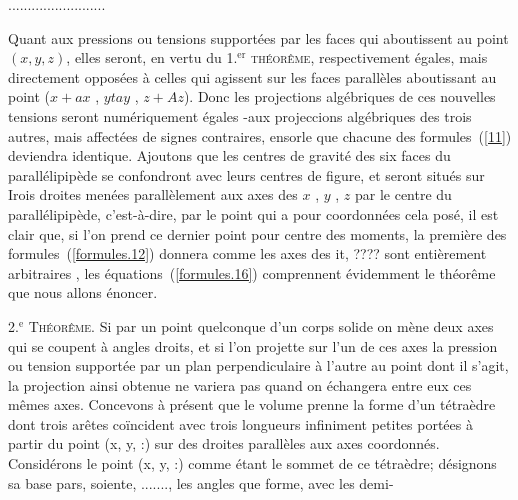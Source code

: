 \documentclass[11pt, twoside, leqno]{article}
\renewcommand{\eqref}[1]{(\ref{#1})}
\begin{document}
.........................

Quant aux pressions ou tensions supportées par les faces qui aboutissent au point $(x,y,z)$, elles seront, en vertu du 1.${^{\text{er}}}$ \textsc{théorême}, respectivement égales, mais directement opposées à celles qui agissent sur les faces parallèles aboutissant au point ($x + ax$ , $y tay$ , $z + Az$). Donc les projections algébriques de ces nouvelles tensions seront numériquement égales -aux projeccions algébriques des trois autres, mais affectées de signes contraires, ensorle que chacune des formules~\eqref{11} deviendra identique. Ajoutons que les centres de gravité des six faces du parallélipipède se confondront avec leurs centres de figure, et seront situés sur Irois droites menées parallèlement aux axes des $x$ , $y$ , $z$ par le centre du parallélipipède, c'est\hbox{-}à\hbox{-}dire, par le point qui a pour coordonnées cela posé, il est clair que, si l'on prend ce dernier point pour centre des moments, la première des formules~\eqref{formules.12} donnera comme les axes des it, ???? sont entièrement arbitraires , les équations~\eqref{formules.16} comprennent évidemment le théorême que nous allons énoncer.

2.${^{\text{e}}}$ \textsc{Théorême}.
Si par un point quelconque d'un corps solide on mène deux axes qui se coupent à angles droits, et si l'on projette sur l'un de ces axes la pression ou tension supportée par un plan perpendiculaire à l'autre au point dont il s'agit, la projection ainsi obtenue ne variera pas quand on échangera entre eux ces mêmes axes. Concevons à présent que le volume prenne la forme d'un tétraèdre dont trois arêtes coïncident avec trois longueurs infiniment petites portées à partir du point (x, y, :) sur des droites parallèles aux axes coordonnés. Considérons le point (x, y, :) comme étant le sommet de ce tétraèdre; désignons sa base pars, soiente, ......., les angles que forme, avec les demi-
\end{document}
